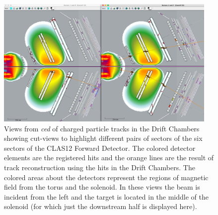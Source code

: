 \begin{figure}
\centering
\includegraphics[width=0.95\textwidth]{pics/dcTrack3.png}
\caption{Views from {\it ced} of charged particle tracks in the Drift Chambers showing cut-views to highlight
  different pairs of sectors of the six sectors of the CLAS12 Forward Detector. The colored detector elements
  are the registered hits and the orange lines are the result of track reconstruction using the hits in the Drift
  Chambers. The colored areas about the detectors represent the regions of magnetic field from the torus and
  the solenoid. In these views the beam is incident from the left and the target is located in the middle of the
  solenoid (for which just the downstream half is displayed here).}
\label{fig:dcTracks}
\end{figure}

